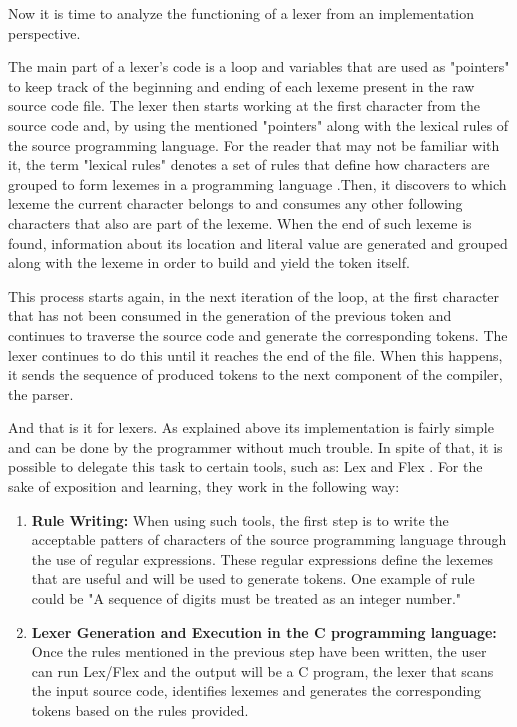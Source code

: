 Now it is time to analyze the functioning of a lexer from an implementation perspective.

The main part of a lexer's code is a loop and variables that are used as "pointers" to keep track of the beginning and ending of each lexeme present in the raw source code file. The lexer then starts working at the first character from the source code and, by using the mentioned "pointers" along with the lexical rules of the source programming language. For the reader that may not be familiar with it, the term "lexical rules" denotes a set of rules that define how characters are grouped to form lexemes in a programming language .Then, it discovers to which lexeme the current character belongs to and consumes any other following characters that also are part of the lexeme. When the end of such lexeme is found, information about its location and literal value are generated and grouped along with the lexeme in order to build and yield the token itself.

This process starts again, in the next iteration of the loop, at the first character that has not been consumed in the generation of the previous token and continues to traverse the source code and generate the corresponding tokens. The lexer continues to do this until it reaches the end of the file. When this happens, it sends the sequence of produced tokens to the next component of the compiler, the parser.

And that is it for lexers. As explained above its implementation is fairly simple and can be done by the programmer without much trouble. In spite of that, it is possible to delegate this task to certain tools, such as: Lex \cite{lesk1975lex} and Flex \cite{Flex}. For the sake of exposition and learning, they work in the following way:

\begin{enumerate}
    \item \textbf{Rule Writing:} When using such tools, the first step is to write the acceptable patters of characters of the source programming language through the use of regular expressions. These regular expressions define the lexemes that are useful and will be used to generate tokens. One example of rule could be "A sequence of digits must be treated as an integer number."
    
    \item \textbf{Lexer Generation and Execution in the C programming language:} Once the rules mentioned in the previous step have been written, the user can run Lex/Flex and the output will be a C program, the lexer that scans the input source code, identifies lexemes and generates the corresponding tokens based on the rules provided.
    
\end{enumerate}

